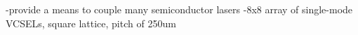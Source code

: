 \cite{vabr2017}

\cite{brfi2015}
-provide a means to couple many semiconductor lasers
-8x8 array of single-mode VCSELs, square lattice, pitch of 250um


\cite{coge2011}

\cite{nash2013}

\cite{shna2016}

\cite{wuso2014}

\cite{mebo2015}

\cite{padu2011}

\cite{vame2014}

\cite{lipe2019}

\cite{tafe2018}




